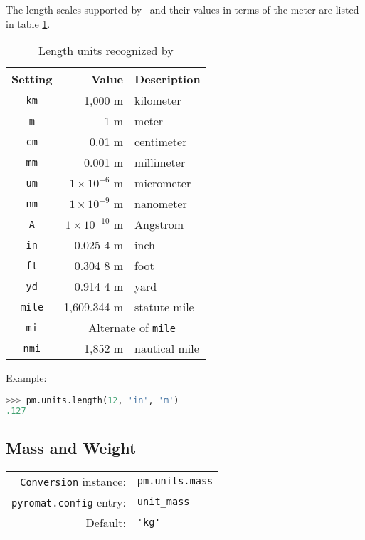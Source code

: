 The length scales supported by \PM\ and their values in terms of the meter are listed in table \ref{tab:length}.

\begin{table}
\centering
\caption{Length units recognized by \PM}\label{tab:length}
\begin{tabular}{crl}
\hline
Setting & Value & Description\\
\hline
\verb|km| & 1,000 m & kilometer\\
\verb|m| & 1 m & meter\\
\verb|cm| & 0.01 m & centimeter\\
\verb|mm| & 0.001 m & millimeter\\
\verb|um| & $1\times 10^{-6}$ m & micrometer\\
\verb|nm| & $1\times 10^{-9}$ m & nanometer\\
\verb|A| &  $1\times 10^{-10}$ m & Angstrom\\
\verb|in| & 0.025 4 m & inch\\
\verb|ft| & 0.304 8 m & foot\\
\verb|yd| & 0.914 4 m & yard\\
\verb|mile| & 1,609.344 m & statute mile\\
\verb|mi| & \multicolumn{2}{c}{Alternate of \texttt{mile}}\\
\verb|nmi| & 1,852 m & nautical mile\\
\hline
\end{tabular}
\end{table}

Example:
\begin{lstlisting}[language=Python]
>>> pm.units.length(12, 'in', 'm')
.127
\end{lstlisting}


%
%

\subsection{Mass and Weight}\label{sec:units:mass}

\begin{tabular}{rl}
\hline
\verb|Conversion| instance: & \verb|pm.units.mass|\\
\verb|pyromat.config| entry: & \verb|unit_mass|\\
Default: & \verb|'kg'|\\
\hline
\end{tabular}
\vspace{1em}

